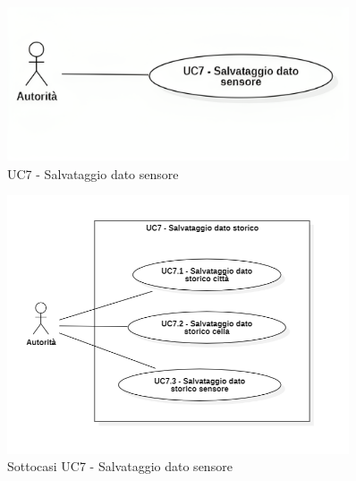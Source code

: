 









\begin{figure}[H]
    \centering
    \includegraphics[width=0.9\textwidth]{../Images/uc7.png}
    \caption{UC7 - Salvataggio dato sensore}
    \label{fig:UC7}
\end{figure}


\begin{figure}[H]
    \centering
    \includegraphics[width=0.9\textwidth]{../Images/uc7_Subcase.PNG}
    \caption{Sottocasi UC7 - Salvataggio dato sensore}
    \label{fig:UC7_sub}
\end{figure}

